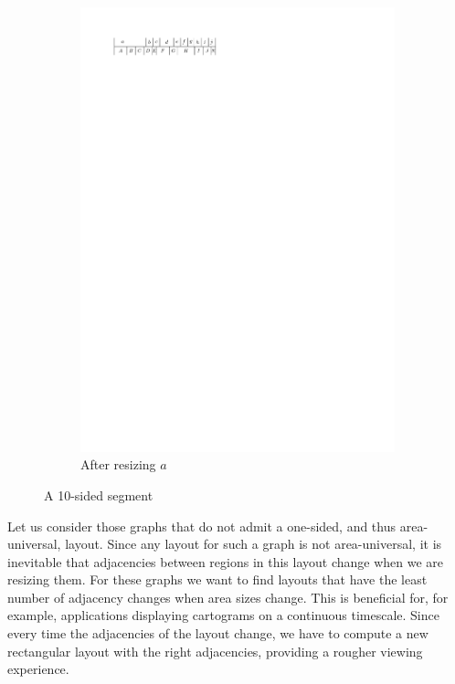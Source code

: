 \begin{figure}[b]
\begin{subfigure}[b]{0.45 \textwidth}
      \includegraphics[width=\textwidth]{introduction/img/10sidedAfter.pdf}
      \caption{After resizing $a$}
      \label{fig:intro:10sidedAfter}
    \end{subfigure}
    \quad
    \caption{A 10-sided segment}
    \label{fig:intro:10sided}
  \end{figure}
  Let us consider those graphs that do not admit a one-sided, and thus area-universal, layout.
  Since any layout for such a graph is not area-universal, it is inevitable that adjacencies between regions in this layout change when we are resizing them.
  For these graphs we want to find layouts that have the least number of adjacency changes when area sizes change.
  This is beneficial for, for example, applications displaying cartograms on a continuous timescale.
  Since every time the adjacencies of the layout change, we have to compute a new rectangular layout with the right adjacencies, providing a rougher viewing experience.

